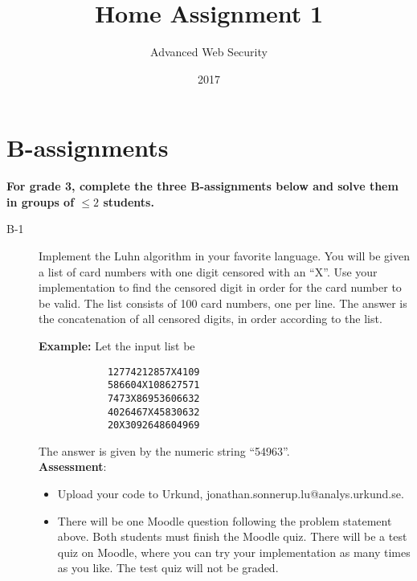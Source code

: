 \documentclass{article}
\begin{document}
	
	\title{Home Assignment 1}
	\author{Advanced Web Security}
	\date{2017}
	
	\maketitle
	
	\section*{B-assignments}
	\textbf{For grade 3, complete the three B-assignments below and solve them in groups of $\leq 2$ students.}
	
	\begin{description}
		
		\item[B-1]{Implement the Luhn algorithm in your favorite language. You will be given
			a list of card numbers with one digit censored with an ``X''. Use your implementation to find the
			censored digit in order for the card number to be valid. The list consists of 100 card numbers,
			one per line. The answer is the concatenation of all censored digits, 
			in order according to the list.
			
			\textbf{Example:} Let the input list be
			\begin{verbatim}
			12774212857X4109
			586604X108627571
			7473X86953606632
			4026467X45830632
			20X3092648604969
			\end{verbatim}
			The answer is given by the numeric string ``54963''.\\
			\textbf{Assessment}:
			\begin{itemize}
				\item Upload your code to Urkund, jonathan.sonnerup.lu@analys.urkund.se.
				\item There will be one Moodle question following the problem statement above. Both students must finish the Moodle quiz.	There will be a test quiz on Moodle, where you can try your implementation as many times as you like. The test quiz will not be graded.
			\end{itemize}
		}
		

\end{description}
\end{document}
